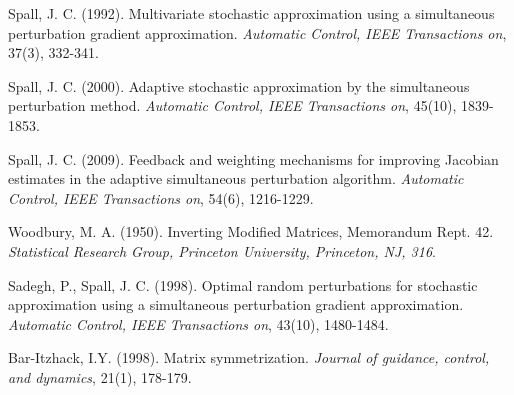 \documentclass[conference]{IEEEtran}
\begin{document}
%
%
%
\begin{thebibliography}{1}

Spall, J. C. (1992). Multivariate stochastic approximation using a simultaneous perturbation gradient approximation. \textit{Automatic Control, IEEE Transactions on}, 37(3), 332-341.

Spall, J. C. (2000). Adaptive stochastic approximation by the simultaneous perturbation method. \textit{Automatic Control, IEEE Transactions on}, 45(10), 1839-1853.

Spall, J. C. (2009). Feedback and weighting mechanisms for improving Jacobian estimates in the adaptive simultaneous perturbation algorithm. \textit{Automatic Control, IEEE Transactions on}, 54(6), 1216-1229.

Woodbury, M. A. (1950). Inverting Modified Matrices, Memorandum Rept. 42. \textit{Statistical Research Group, Princeton University, Princeton, NJ, 316}.

Sadegh, P., Spall, J. C. (1998). Optimal random perturbations for stochastic approximation using a simultaneous perturbation gradient approximation. \textit{Automatic Control, IEEE Transactions on}, 43(10), 1480-1484.

Bar-Itzhack, I.Y. (1998). Matrix symmetrization. \textit{Journal of guidance, control, and dynamics}, 21(1), 178-179.

\end{thebibliography}




\end{document}
